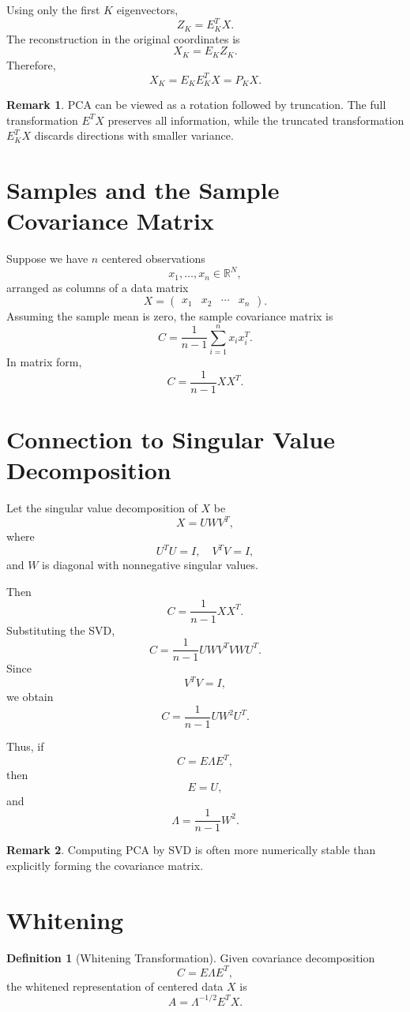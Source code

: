 \documentclass[12pt,oneside]{book}
\numberwithin{equation}{section}
\theoremstyle{definition}
\newtheorem{definition}{Definition}[section]
\newtheorem{remark}{Remark}[section]
\theoremstyle{plain}
\theoremstyle{remark}
\newcommand{\R}{\mathbb{R}}
\begin{document}
Using only the first $K$ eigenvectors,
\[
Z_K=E_K^TX.
\]
The reconstruction in the original coordinates is
\[
X_K=E_KZ_K.
\]
Therefore,
\[
X_K=E_KE_K^TX=P_KX.
\]

\begin{remark}
PCA can be viewed as a rotation followed by truncation. The full transformation $E^TX$ preserves all information, while the truncated transformation $E_K^TX$ discards directions with smaller variance.
\end{remark}

\section{Samples and the Sample Covariance Matrix}

Suppose we have $n$ centered observations
\[
x_1,\dots,x_n \in \R^N,
\]
arranged as columns of a data matrix
\[
X=
\begin{pmatrix}
x_1 & x_2 & \cdots & x_n
\end{pmatrix}.
\]
Assuming the sample mean is zero, the sample covariance matrix is
\[
C
=
\frac{1}{n-1}\sum_{i=1}^n x_ix_i^T.
\]
In matrix form,
\[
C
=
\frac{1}{n-1}XX^T.
\]

\section{Connection to Singular Value Decomposition}

Let the singular value decomposition of $X$ be
\[
X=UWV^T,
\]
where
\[
U^TU=I,
\quad
V^TV=I,
\]
and $W$ is diagonal with nonnegative singular values.

Then
\[
C
=
\frac{1}{n-1}XX^T.
\]
Substituting the SVD,
\[
C
=
\frac{1}{n-1}
UWV^TVWU^T.
\]
Since
\[
V^TV=I,
\]
we obtain
\[
C
=
\frac{1}{n-1}UW^2U^T.
\]

Thus, if
\[
C=E\Lambda E^T,
\]
then
\[
E=U,
\]
and
\[
\Lambda=\frac{1}{n-1}W^2.
\]

\begin{remark}
Computing PCA by SVD is often more numerically stable than explicitly forming the covariance matrix.
\end{remark}

\section{Whitening}

\begin{definition}[Whitening Transformation]
Given covariance decomposition
\[
C=E\Lambda E^T,
\]
the whitened representation of centered data $X$ is
\[
A=\Lambda^{-1/2}E^TX.
\]
\end{definition}
\end{document}
